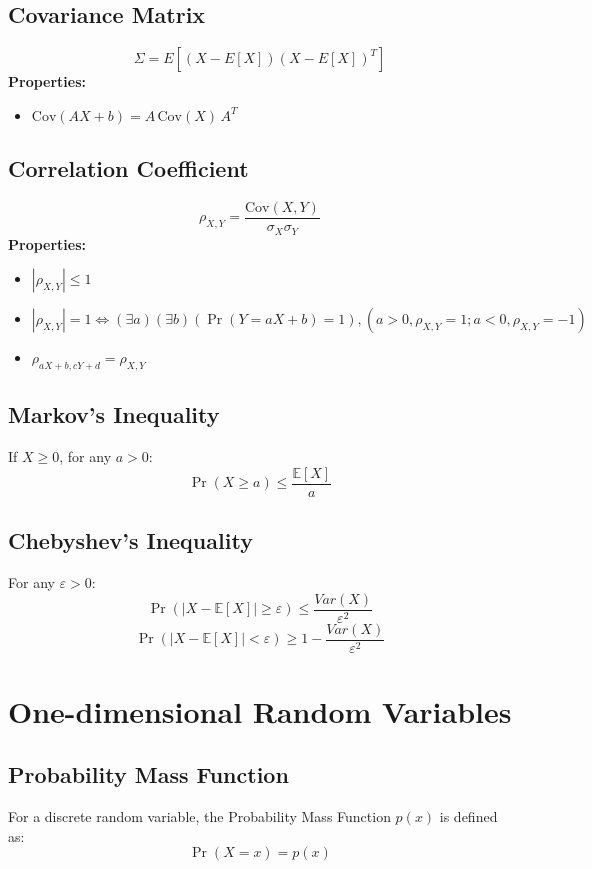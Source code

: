 \documentclass{article}
\begin{document}
\subsection{Covariance Matrix}
\[
    \Sigma = E[(X - E[X])(X - E[X])^T]
\]
\textbf{Properties:}
\begin{itemize}
    \item \(\text{Cov}(AX + b) = A \, \text{Cov}(X) \, A^T\)
\end{itemize}

\subsection{Correlation Coefficient}
\[
    \rho_{X,Y} = \frac{\text{Cov}(X,Y)}{\sigma_X\sigma_Y}
\]
\textbf{Properties:}
\begin{itemize}
    \item \( |\rho_{X,Y}| \le 1 \)
    \item \( |\rho_{X,Y}| = 1 \Leftrightarrow (\exists a)(\exists b)(\Pr(Y=aX+b)=1), (a>0, \rho_{X,Y}=1; a<0, \rho_{X,Y}=-1) \)
    \item \( \rho_{aX + b, cY + d} = \rho_{X,Y} \)
\end{itemize}

\subsection{Markov's Inequality}
If \( X \geq 0 \), for any \( a > 0 \):
\[
    \Pr(X \geq a) \leq \frac{\mathbb{E}[X]}{a}
\]

\subsection{Chebyshev's Inequality}
For any \( \varepsilon > 0 \):
\[
    \Pr(|X-\mathbb{E}[X]| \ge \varepsilon) \le \frac{Var(X)}{\varepsilon^2}
\]
\[
    \Pr(|X-\mathbb{E}[X]| < \varepsilon) \ge 1 - \frac{Var(X)}{\varepsilon^2}
\]

\newpage
\section{One-dimensional Random Variables}

\subsection{Probability Mass Function}
For a discrete random variable, the Probability Mass Function \( p(x) \) is defined as:
\[
    \Pr(X=x) = p(x)
\]
\end{document}
